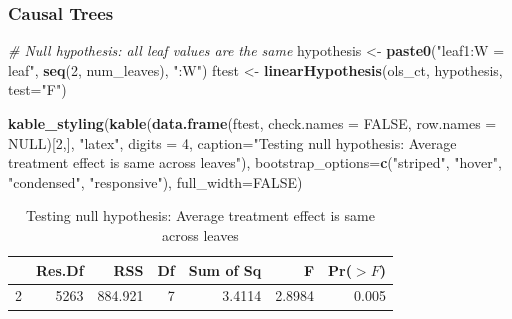 \documentclass[
  shownotes,
  xcolor={svgnames},
  hyperref={colorlinks,citecolor=DarkBlue,linkcolor=DarkRed,urlcolor=DarkBlue}
  , aspectratio=169]{beamer}
\newenvironment{Shaded}{\begin{snugshade}}{\end{snugshade}}
\newcommand{\CommentTok}[1]{\textcolor[rgb]{0.56,0.35,0.01}{\textit{#1}}}
\newcommand{\DataTypeTok}[1]{\textcolor[rgb]{0.13,0.29,0.53}{#1}}
\newcommand{\DecValTok}[1]{\textcolor[rgb]{0.00,0.00,0.81}{#1}}
\newcommand{\KeywordTok}[1]{\textcolor[rgb]{0.13,0.29,0.53}{\textbf{#1}}}
\newcommand{\NormalTok}[1]{#1}
\newcommand{\OtherTok}[1]{\textcolor[rgb]{0.56,0.35,0.01}{#1}}
\newcommand{\StringTok}[1]{\textcolor[rgb]{0.31,0.60,0.02}{#1}}
\begin{document}
\begin{frame}[fragile]
\frametitle{Causal Trees}

\begin{scriptsize}


\begin{Shaded}
\begin{Highlighting}[]
\CommentTok{\# Null hypothesis: all leaf values are the same}
\NormalTok{hypothesis \textless{}{-}}\StringTok{ }\KeywordTok{paste0}\NormalTok{(}\StringTok{"leaf1:W = leaf"}\NormalTok{, }\KeywordTok{seq}\NormalTok{(}\DecValTok{2}\NormalTok{, num\_leaves), }\StringTok{":W"}\NormalTok{)}
\NormalTok{ftest \textless{}{-}}\StringTok{ }\KeywordTok{linearHypothesis}\NormalTok{(ols\_ct, hypothesis, }\DataTypeTok{test=}\StringTok{"F"}\NormalTok{)}

\KeywordTok{kable\_styling}\NormalTok{(}\KeywordTok{kable}\NormalTok{(}\KeywordTok{data.frame}\NormalTok{(ftest, }\DataTypeTok{check.names =} \OtherTok{FALSE}\NormalTok{, }\DataTypeTok{row.names =} \OtherTok{NULL}\NormalTok{)[}\DecValTok{2}\NormalTok{,],}
                    \StringTok{"latex"}\NormalTok{, }\DataTypeTok{digits =} \DecValTok{4}\NormalTok{,}
                    \DataTypeTok{caption=}\StringTok{"Testing null hypothesis: Average treatment effect is same across leaves"}\NormalTok{),}
              \DataTypeTok{bootstrap\_options=}\KeywordTok{c}\NormalTok{(}\StringTok{"striped"}\NormalTok{, }\StringTok{"hover"}\NormalTok{, }\StringTok{"condensed"}\NormalTok{, }\StringTok{"responsive"}\NormalTok{),}
              \DataTypeTok{full\_width=}\OtherTok{FALSE}\NormalTok{)}
\end{Highlighting}
\end{Shaded}
\end{scriptsize}

\begin{table}

\caption{\label{tab:unnamed-chunk-15}Testing null hypothesis: Average treatment effect is same across leaves}
\centering
\begin{tabular}[t]{l|r|r|r|r|r|r}
\hline
  & Res.Df & RSS & Df & Sum of Sq & F & Pr($>F$)\\
\hline
2 & 5263 & 884.921 & 7 & 3.4114 & 2.8984 & 0.005\\
\hline
\end{tabular}
\end{table}

\end{frame}


\end{document}
